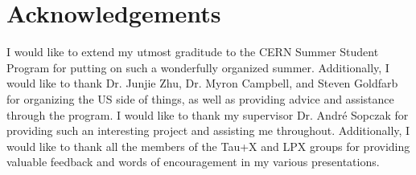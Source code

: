 \section*{Acknowledgements}
    I would like to extend my utmost graditude to the CERN Summer Student Program for putting on such a wonderfully organized summer. Additionally, I would like to thank Dr. Junjie Zhu, Dr. Myron Campbell, and Steven Goldfarb for organizing the US side of things, as well as providing advice and assistance through the program. I would like to thank my supervisor Dr. Andr\'e Sopczak for providing such an interesting project and assisting me throughout. Additionally, I would like to thank all the members of the Tau+X and LPX groups for providing valuable feedback and words of encouragement in my various presentations.
